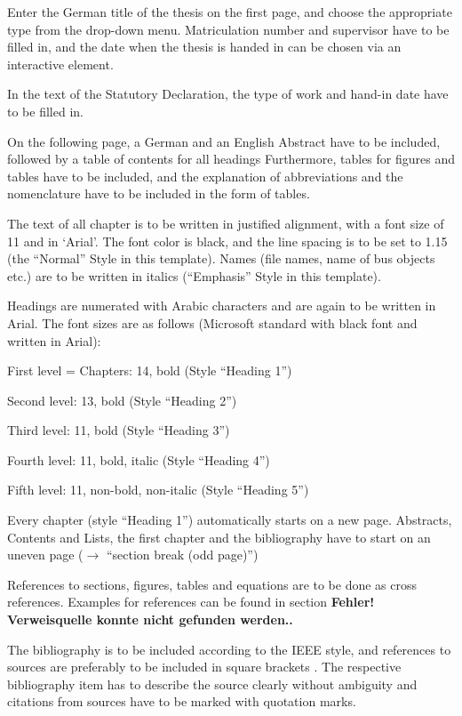 \documentclass[11pt, a4paper, twoside]{report}
\begin{document}
Enter the German title of the thesis on the first page, and choose the appropriate type from the drop-down menu. Matriculation number and supervisor have to be filled in, and the date when the thesis is handed in can be chosen via an interactive element.

In the text of the Statutory Declaration, the type of work and hand-in date have to be filled in.

On the following page, a German and an English Abstract have to be included, followed by a table of contents for all headings Furthermore, tables for figures and tables have to be included, and the explanation of abbreviations and the nomenclature have to be included in the form of tables.

The text of all chapter is to be written in justified alignment, with a font size of 11 and in ‘Arial’. The font color is black, and the line spacing is to be set to 1.15 (the “Normal” Style in this template). Names (file names, name of bus objects etc.) are to be written in italics (“Emphasis” Style in this template).

Headings are numerated with Arabic characters and are again to be written in Arial. The font sizes are as follows (Microsoft standard with black font and written in Arial):
\begin{description}[labelindent=1cm, topsep=0pt, noitemsep]
	\item First level = Chapters: 14, bold (Style “Heading 1”)
	\item Second level: 13, bold (Style “Heading 2”)
	\item Third level: 11, bold (Style “Heading 3”)
	\item Fourth level: 11, bold, italic (Style “Heading 4”)
	\item Fifth level: 11, non-bold, non-italic (Style “Heading 5”)
\end{description}
Every chapter (style ``Heading 1'') automatically starts on a new page. Abstracts, Contents and Lists, the first chapter and the bibliography have to start on an uneven page ($\rightarrow$ ``section break (odd page)'') 

References to sections, figures, tables and equations are to be done as cross references. Examples for references can be found in section \textbf{Fehler! Verweisquelle konnte nicht gefunden werden..}

The bibliography is to be included according to the IEEE style, and references to sources are preferably to be included in square brackets \cite{Alberi2017}. The respective bibliography item has to describe the source clearly without ambiguity and citations from sources have to be marked with quotation marks.
\end{document}
